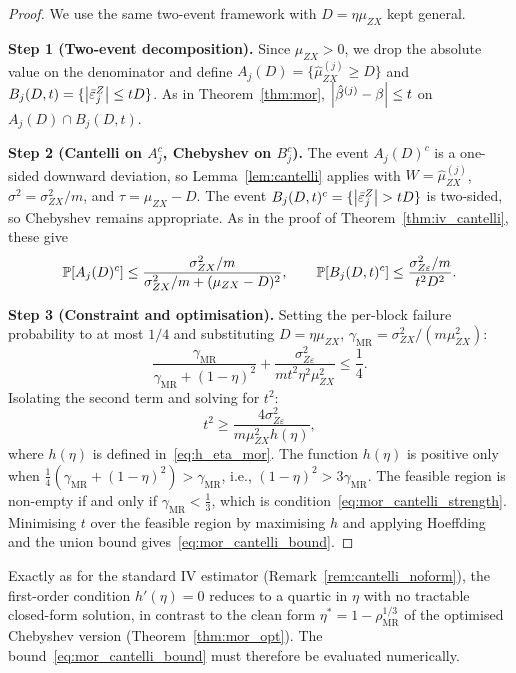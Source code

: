 \begin{proof}
    We use the same two-event framework with $D = \eta\mu_{ZX}$ kept general.

    \medskip\noindent\textbf{Step 1 (Two-event decomposition).}
    Since $\mu_{ZX}>0$, we drop the absolute value on the denominator and define $A_j(D) = \{\hat{\mu}_{ZX}^{(j)} \geq D\}$ and $B_j(D,t) = \{\left|\bar{\varepsilon}_j^Z\right|\leq tD\}$. As in Theorem~\ref{thm:mor}, $\left|\hat\beta^{(j)}-\beta\right|\leq t$ on $A_j(D)\cap B_j(D,t)$.

    \medskip\noindent\textbf{Step 2 (Cantelli on $A_j^c$, Chebyshev on $B_j^c$).}
    The event $A_j(D)^c$ is a one-sided downward deviation, so Lemma~\ref{lem:cantelli} applies with $W=\hat{\mu}_{ZX}^{(j)}$, $\sigma^2=\sigma_{ZX}^2/m$, and $\tau=\mu_{ZX}-D$. The event $B_j(D,t)^c = \{\abs{\bar{\varepsilon}_j^Z}>tD\}$ is two-sided, so Chebyshev remains appropriate. As in the proof of Theorem~\ref{thm:iv_cantelli}, these give
    \[
        \operatorname{\mathbb{P}}[A_j(D)^c] \leq \frac{\sigma_{ZX}^2/m}{\sigma_{ZX}^2/m +(\mu_{ZX} - D)^2}, \qquad
        \operatorname{\mathbb{P}}[B_j(D,t)^c] \leq \frac{\sigma_{Z\varepsilon}^2/m}{t^2 D^2}.
    \]

    \medskip\noindent\textbf{Step 3 (Constraint and optimisation).}
    Setting the per-block failure probability to at most $1/4$ and substituting $D=\eta\mu_{ZX}$, $\gamma_{\mathrm{MR}}=\sigma_{ZX}^2/(m\mu_{ZX}^2)$:
    \[
        \frac{\gamma_{\mathrm{MR}}}{\gamma_{\mathrm{MR}}+(1-\eta)^2}
        + \frac{\sigma_{Z\varepsilon}^2}{m t^2\eta^2\mu_{ZX}^2}
        \leq \frac{1}{4}.
    \]
    Isolating the second term and solving for $t^2$:
    \[
        t^2 \geq \frac{4\sigma_{Z\varepsilon}^2}{m\mu_{ZX}^2h(\eta)},
    \]
    where $h(\eta)$ is defined in~\eqref{eq:h_eta_mor}. The function $h(\eta)$ is positive only when $\frac{1}{4}(\gamma_{\mathrm{MR}}+(1-\eta)^2)>\gamma_{\mathrm{MR}}$, i.e., $(1-\eta)^2 > 3\gamma_{\mathrm{MR}}$. The feasible region is non-empty if and only if $\gamma_{\mathrm{MR}} < \frac{1}{3}$, which is condition~\eqref{eq:mor_cantelli_strength}. Minimising $t$ over the feasible region by maximising $h$ and applying Hoeffding and the union bound gives~\eqref{eq:mor_cantelli_bound}.
\end{proof}

\begin{remark}
    \label{rem:mor_cantelli_noform}
    Exactly as for the standard IV estimator (Remark~\ref{rem:cantelli_noform}), the first-order condition $h'(\eta)=0$ reduces to a quartic in $\eta$ with no tractable closed-form solution, in contrast to the clean form $\eta^*=1-\rho_{\mathrm{MR}}^{1/3}$ of the optimised Chebyshev version (Theorem~\ref{thm:mor_opt}). The bound~\eqref{eq:mor_cantelli_bound} must therefore be evaluated numerically.
\end{remark}
